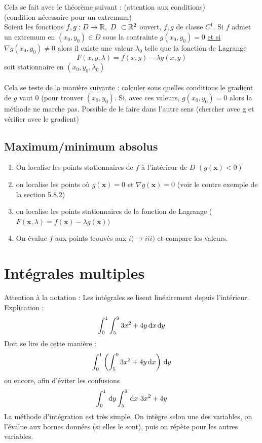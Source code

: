 \documentclass[12pt,a4paper]{article}
\renewcommand{\)}{\right)}
\renewcommand{\(}{\left(}
\begin{document}
Cela se fait avec le théorème suivant : (attention aux conditions) \\
 (condition nécessaire pour un extremum)\\
Soient les fonctions $f,g : D \to \R,\ D\ \subset \R^2$ ouvert, $f,g$ de classe $C^1$. Si $f$ admet un extremum en $(x_0,y_0) \in D$ sous la contrainte $g(x_0,y_0) = 0$ \uline{et si $\nabla g(x_0,y_0) \neq 0$} alors il existe une valeur $\lambda_0$ telle que la fonction de Lagrange
\begin{equation*}
	F(x,y,\lambda) = f(x,y) - \lambda g(x,y)
\end{equation*}
soit stationnaire en $(x_0,y_0,\lambda_0)$\\
\\
Cela se teste de la manière suivante : calculer sous quelles conditions le gradient de $g$ vaut 0 (pour trouver  $(x_0,y_0)$. Si, avec ces valeurs, $g(x_0,y_0) = 0$ alors la méthode ne marche pas. Possible de le faire dans l'autre sens (chercher avec g et vérifier avec le gradient)

\subsection{Maximum/minimum absolus}
\begin{enumerate}[label=\roman*)]
	\item 	On localise les points stationnaires de $f$ à l'intérieur de $D$ $(g(\textbf{x}) < 0)$
	\item 	on localise les points où $g(\textbf{x}) = 0$ et $\nabla g(\textbf{x}) = 0$ (voir le contre exemple de la section 5.8.2)
	\item 	on localise les points stationnaires de la fonction de Lagrange \big($F(\textbf{x},\lambda) = f(\textbf{x}) - \lambda g(\textbf{x})\big)$
	\item 	On évalue $f$ aux points trouvés aux $i) \to iii)$ et compare les valeurs.
\end{enumerate}

\section{Intégrales multiples}
Attention à la notation : Les intégrales se lisent linéairement depuis l'intérieur. Explication : 
\[\int_0^1\int_5^9 3x^2 + 4y \, \mathrm d x\, \mathrm d y\]
Doit se lire de cette manière : 
\[\int_0^1\(\int_5^9 3x^2 + 4y \deriv{x}\)\deriv{y}\]
ou encore, afin d'éviter les confusions 
\[\int_0^1 \, \mathrm d y\int_5^9 \, \mathrm d x\ 3x^2 + 4y\]
La méthode d'intégration est très simple. On intègre selon une des variables, on l'évalue aux bornes données (si elles le sont), puis on répète pour les autres variables.
\end{document}
